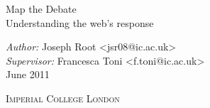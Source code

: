\begin{titlepage}

\begin{center}

\vspace*{\fill}


\minionfont{}\Huge Map the Debate \\[0.3cm]

\caslonfont{}\normalsize Understanding the web's response \\[1cm]

\caslonfont

\emph{Author:} Joseph Root <jsr08@ic.ac.uk>\\
\emph{Supervisor:} Francesca Toni <f.toni@ic.ac.uk>\\ [1cm]
June 2011 \\[3cm]


% 
% 

\vspace*{\fill}

\scshape Imperial College London

\end{center}

\end{titlepage}